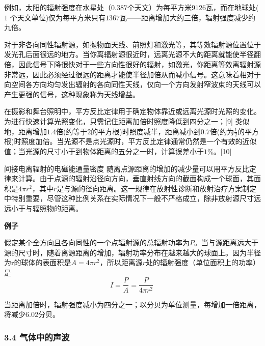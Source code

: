例如，太阳的辐射强度在水星处（$0.387$个天文）为每平方米$9126$瓦，而在地球处($1$ 个天文单位)仅为每平方米只有$1367$瓦——距离增加大约三倍，辐射强度减少约九倍。

对于非各向同性辐射源，如抛物面天线、前照灯和激光等，其等效辐射源位置位于发光孔后面很远的地方。当你离辐射源很近时，远离光源不大的距离就能使半径翻倍，因此信号下降很快对于一些方向性很好的辐射，如激光，你距离等效离辐射源非常远，因此必须经过很远的距离才能使半径加倍从而减小信号。这意味着相对于向空间各方向均匀发出辐射的各向同性天线，仅向一个方向发射窄波束的天线可以产生更强的信号，这种现象称为天线增益。

在摄影和舞台照明中，平方反比定律用于确定物体靠近或远离光源时光照的变化。为进行快速计算光照变化，只需记住距离加倍时照度降低到四分之一；[9] 类似地，距离增加$1.4$倍(约等于$2$的平方根)时照度减半，距离减小到$0.7$倍(约为$\frac{1}{2}$的平方根)时照度加倍。当光源不是点光源时，平方反比定律通常仍然是一个有效的近似值；当光源的尺寸小于到物体距离的五分之一时，计算误差小于$1 \%$。[10]

间接电离辐射的电磁能通量密度 随离点源距离的增加的减少量可以用平方反比定律来计算。由于点源的辐射沿径向方向，垂直射线方向的截面构成一个球面，其面积是$4\pi r^2$，其中$r$是与源的径向距离。这一规律在放射性诊断和放射治疗方案制定中特别重要，尽管这种比例关系在实际情况下一般不严格成立，除非放射源尺寸远远小于与辐照物的距离。

\textbf{例子}

假定某个全方向且各向同性的一个点辐射源的总辐射功率为$P$。当与源距离远大于源的尺寸时，随着离源距离的增加，辐射功率分布在越来越大的球面上。因为半径为r的球体的表面积是$A=4\pi r^2$，所以距离源$r$处的辐射强度（单位面积上的功率）是
\begin{equation}
I=\frac{P}{A}=\frac{P}{4\pi r^2}~
\end{equation}

当距离加倍时，辐射强度减小为四分之一；以分贝为单位测量，每增加一倍距离，将减少$6.02$分贝。

\subsubsection{3.4 气体中的声波}
